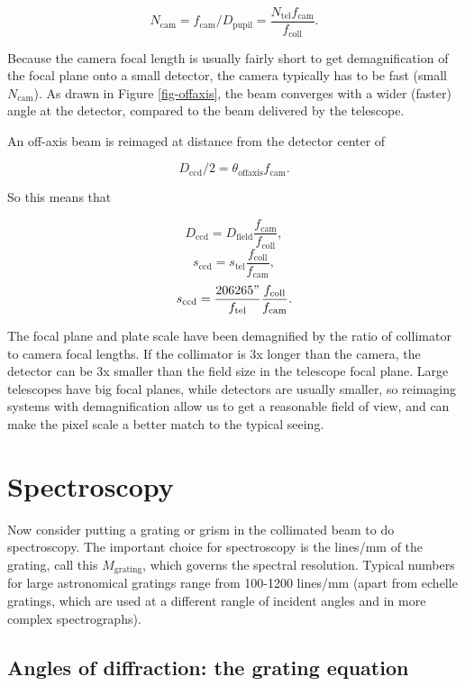\documentclass[12pt]{article}
\begin{document}
$$ N_{\mathrm{cam}} = f_{\mathrm{cam}} / D_{\mathrm{pupil}} = \frac{N_{\mathrm{tel}} f_{\mathrm{cam}}}{f_{\mathrm{coll}}}. $$

Because the camera focal length is usually fairly short to
get demagnification of the focal plane onto a small detector,
the camera typically has to be fast (small $N_{\mathrm{cam}}$).  As drawn in Figure
\ref{fig-offaxis}, the beam converges with a wider (faster) angle
at the detector, compared to the beam delivered by the telescope.

An off-axis beam is reimaged at distance from the detector center of 

$$ D_{\mathrm{ccd}}/2 = \theta_{\mathrm{offaxis}} f_{\mathrm{cam}}. $$

So this means that

$$ D_{\mathrm{ccd}} = D_{\mathrm{field}} \frac{f_{\mathrm{cam}}}{f_{\mathrm{coll}}}, $$
$$ s_{\mathrm{ccd}} = s_{\mathrm{tel}} \frac{f_{\mathrm{coll}}}{f_{\mathrm{cam}}}, $$ 
$$ s_{\mathrm{ccd}} = \frac{206265"}{f_{\mathrm{tel}}} \frac{f_{\mathrm{coll}}}{f_{\mathrm{cam}}}. $$ 

The focal plane and plate scale have been demagnified by the 
ratio of collimator to camera focal lengths.  If the collimator
is 3x longer than the camera, the detector can be 3x smaller
than the field size in the telescope focal plane.
Large telescopes have big focal planes, while detectors are 
usually smaller, so reimaging systems with demagnification 
allow us to get a reasonable field of view, and can
make the pixel scale a better match to the typical seeing.


\section{Spectroscopy}

Now consider putting a grating or grism in the collimated
beam to do spectroscopy.  The important choice for spectroscopy
is the lines/mm of the grating, call this $M_{\mathrm{grating}}$, which 
governs the spectral resolution.  Typical numbers 
for large astronomical gratings range from 100-1200 lines/mm
(apart from echelle gratings, which are used at a different 
rangle of incident angles and in more complex spectrographs).

\subsection{Angles of diffraction: the grating equation}
\end{document}
